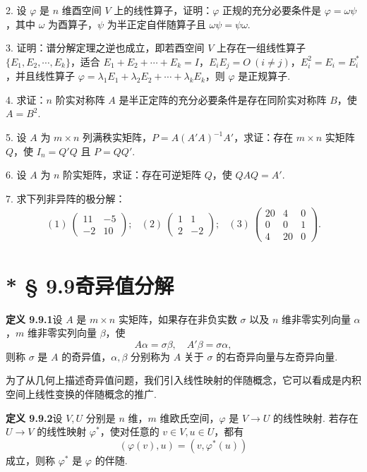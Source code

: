 \documentclass[UTF8, 12pt, fontset=fandol, oneside]{ctexart}
\begin{document}
2. 设 $\varphi$ 是 $n$ 维酉空间 $V$ 上的线性算子，证明：$\varphi$ 正规的充分必要条件是 $\varphi=\omega\psi$，其中 $\omega$ 为酉算子，$\psi$ 为半正定自伴随算子且 $\omega\psi=\psi\omega$.

3. 证明：谱分解定理之逆也成立，即若酉空间 $V$ 上存在一组线性算子 $\{E_1,E_2,\cdots,E_k\}$，适合 $E_1+E_2+\cdots+E_k=I$，$E_iE_j=O\ (i\ne j)$，$E_i^2=E_i=E_i^*$，并且线性算子 $\varphi=\lambda_1E_1+\lambda_2E_2+\cdots+\lambda_kE_k$，则 $\varphi$ 是正规算子.

4. 求证：$n$ 阶实对称阵 $A$ 是半正定阵的充分必要条件是存在同阶实对称阵 $B$，使 $A=B^2$.

5. 设 $A$ 为 $m\times n$ 列满秩实矩阵，$P=A(A'A)^{-1}A'$，求证：存在 $m\times n$ 实矩阵 $Q$，使 $I_n=Q'Q$ 且 $P=QQ'$.

6. 设 $A$ 为 $n$ 阶实矩阵，求证：存在可逆矩阵 $Q$，使 $QAQ=A'$.

7. 求下列非异阵的极分解：
\[
\begin{array}{lll}
(1)\ \left(\begin{array}{rr}11 & -5\\ -2 & 10\end{array}\right);
&
(2)\ \left(\begin{array}{rr}1 & 1\\ 2 & -2\end{array}\right);
&
(3)\ \left(\begin{array}{rrr}20 & 4 & 0\\ 0 & 0 & 1\\ 4 & 20 & 0\end{array}\right).
\end{array}
\]

\section*{* § 9.9\quad 奇异值分解}

\noindent\textbf{定义 9.9.1}\quad 设 $A$ 是 $m\times n$ 实矩阵，如果存在非负实数 $\sigma$ 以及 $n$ 维非零实列向量 $\alpha$，$m$ 维非零实列向量 $\beta$，使
\[
  A\alpha=\sigma\beta,\quad A'\beta=\sigma\alpha,
\]
则称 $\sigma$ 是 $A$ 的奇异值，$\alpha,\beta$ 分别称为 $A$ 关于 $\sigma$ 的右奇异向量与左奇异向量.

为了从几何上描述奇异值问题，我们引入线性映射的伴随概念，它可以看成是内积空间上线性变换的伴随概念的推广.

\noindent\textbf{定义 9.9.2}\quad 设 $V,U$ 分别是 $n$ 维，$m$ 维欧氏空间，$\varphi$ 是 $V\to U$ 的线性映射. 若存在 $U\to V$ 的线性映射 $\varphi^*$，使对任意的 $v\in V,u\in U$，都有
\[
  (\varphi(v),u)=(v,\varphi^*(u))
\]
成立，则称 $\varphi^*$ 是 $\varphi$ 的伴随.
\end{document}
